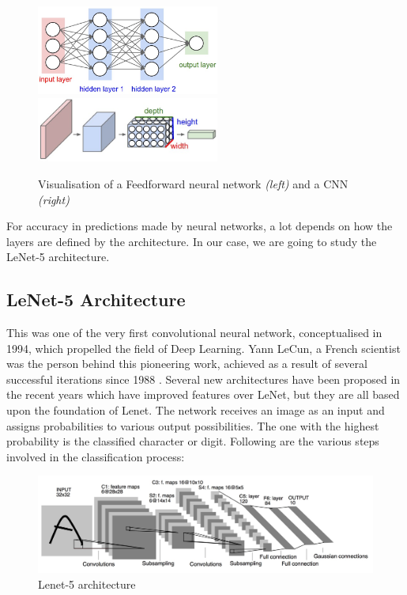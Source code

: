 \begin{figure}[h!]
\centering
\includegraphics[width=6cm]{figures/neural_net.png}
\hspace{7mm}
\includegraphics[width=6cm]{figures/cnn.png}
\caption{Visualisation of a Feedforward neural network \textit{(left)} and a CNN \textit{(right)}}
\label{fig:cnn6}
\end{figure}

For accuracy in predictions made by neural networks, a lot depends on how the layers are defined by the architecture. In our case, we are going to study the LeNet-5 architecture. 

\subsection*{LeNet-5 Architecture}
\label{sect5_1_2_1a}

This was one of the very first convolutional neural network, conceptualised in 1994, which propelled the field of Deep Learning. Yann LeCun, a French scientist was the person behind this pioneering work, achieved as a result of several successful iterations since 1988 \cite{cnn_culurciello}. Several new architectures have been proposed in the recent years which have improved features over LeNet, but they are all based upon the foundation of Lenet. \newline\newline
The network receives an image as an input and assigns probabilities to various output possibilities. The one with the highest probability is the classified character or digit. Following are the various steps involved in the classification process:
\begin{figure}[h!]
\centering
\includegraphics[width=\linewidth]{figures/Lenet5.png}
\caption{Lenet-5 architecture}
\label{fig:cnn7}
\end{figure}

